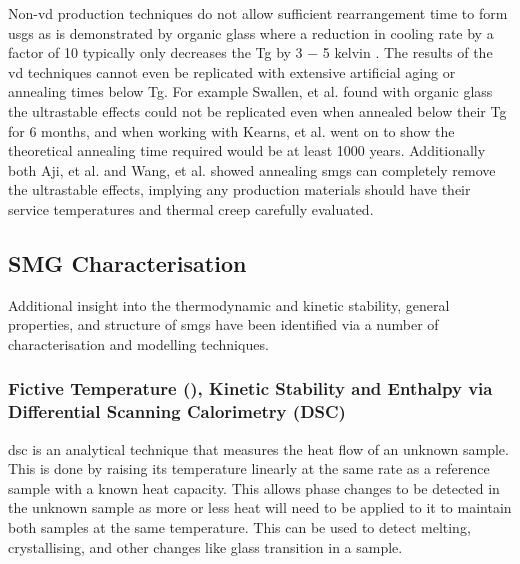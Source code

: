 \documentclass[a4paper,12pt,oneside]{report}%
\begin{document}
Non-\gls{vd} production techniques do not allow sufficient rearrangement time to form \glspl{usg} as is demonstrated by organic glass where a reduction in cooling rate by a factor of 10 typically only decreases the \gls{Tg} by 3 $-$ 5 kelvin \cite{Ediger1996, Dawson2011}.  The results of the \gls{vd} techniques cannot even be replicated with extensive artificial aging or annealing times below \gls{Tg}. For example Swallen, et al. \cite{Swallen2007} found with organic glass  the ultrastable effects could not be replicated even when annealed below their \gls{Tg} for 6 months, and when working with Kearns, et al. \cite{Kearns2008} went on to show the theoretical annealing time required would be at least 1000 years. Additionally both Aji, et al. \cite{Aji2013} and Wang, et al. \cite{Wang2014} showed annealing \glspl{smg} can completely remove the ultrastable effects, implying any production materials should have their service temperatures and thermal creep carefully evaluated.

\subsection{SMG Characterisation}
Additional insight into the thermodynamic and kinetic stability, general properties, and structure of \glspl{smg} have been identified via a number of characterisation and modelling techniques. 

\subsubsection{Fictive Temperature (\Tf), Kinetic Stability and Enthalpy via Differential Scanning Calorimetry (DSC)}
\Gls{dsc} is an analytical technique that measures the heat flow of an unknown sample. This is done by raising its temperature linearly at the same rate as a reference sample with a known heat capacity. This allows phase changes to be detected in the unknown sample as more or less heat will need to be applied to it to maintain both samples at the same temperature. This can be used to detect melting, crystallising, and other changes like glass transition in a sample.
\end{document}

